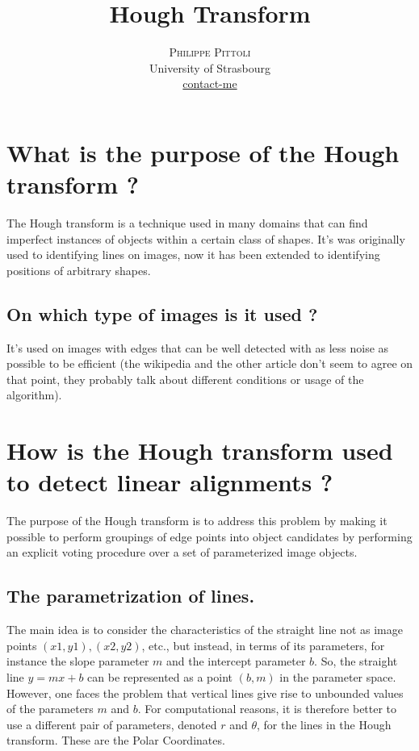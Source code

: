 \documentclass[twoside]{article}
\title{\vspace{-15mm}\fontsize{24pt}{10pt}\selectfont\textbf{Hough Transform}} %
\author{
\large
\textsc{Philippe Pittoli}\\[2mm] %
\normalsize University of Strasbourg \\ %
\normalsize \href{mailto:philippe.pittoli@etu.unistra.fr}{contact-me} %
\vspace{-5mm}
}
\date{}
\begin{document}
\maketitle %

\thispagestyle{fancy} %


\section{What is the purpose of the Hough transform ?}
The Hough transform is a technique used in many domains that can find imperfect instances of objects within a certain class of shapes.
It's was originally used to identifying lines on images, now it has been extended to identifying positions of arbitrary shapes.
\subsection{On which type of images is it used ?}
It's used on images with edges that can be well detected with as less noise as possible to be efficient (the wikipedia and the other article don't seem to agree on that point, they probably talk about different conditions or usage of the algorithm).

\section{How is the Hough transform used to detect linear alignments ?}
The purpose of the Hough transform is to address this problem by making it possible to perform groupings of edge points into object candidates by performing an explicit voting procedure over a set of parameterized image objects.

\subsection{The parametrization of lines.}
The main idea is to consider the characteristics of the straight line not as image points $(x1, y1), (x2, y2)$, etc., 
but instead, in terms of its parameters, for instance the slope parameter $m$ and the intercept parameter $b$. 
So, the straight line $y = mx + b$ can be represented as a point $(b, m)$ in the parameter space. 
However, one faces the problem that vertical lines give rise to unbounded values of the parameters $m$ and $b$. 
For computational reasons, it is therefore better to use a different pair of parameters, denoted $r$ and $\theta$, for the lines in the Hough transform. 
These are the Polar Coordinates.
\end{document}
